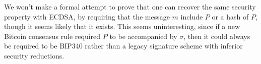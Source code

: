 \documentclass[10pt,a4paper]{article}
\theoremstyle{definition}   %
\theoremstyle{remark}       %
\begin{document}
\vskip 0.2in

We won't make a formal attempt to prove that one can recover the same security property with ECDSA, by requiring that the message $m$ include $P$ or a hash of $P$, though it seems likely that it exists. This seems uninteresting, since if a new Bitcoin consensus rule required $P$ to be accompanied by $\sigma$, then it could always be required to be BIP340 rather than a legacy signature scheme with inferior security reductions.
\end{document}
